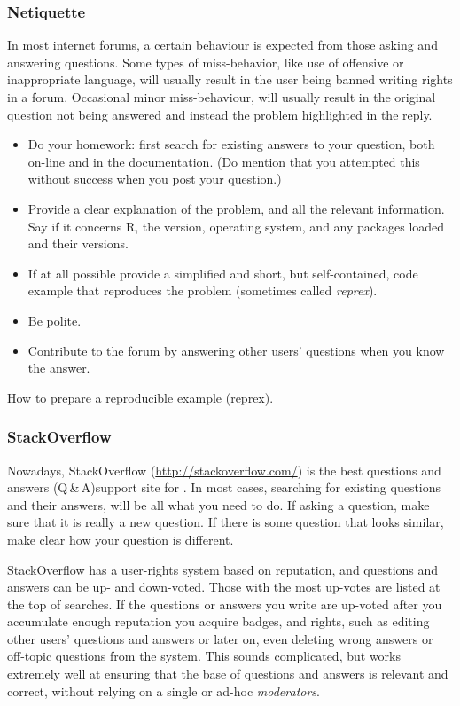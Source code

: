 \documentclass[krantz2,ChapterTOCs]{krantz}\usepackage{knitr}
\begin{document}
\subsubsection{Netiquette}
In most internet forums, a certain behaviour is expected from those asking and answering questions. Some types of miss-behavior, like use of offensive or inappropriate language, will usually result in the user being banned writing rights in a forum. Occasional minor miss-behaviour, will usually result in the original question not being answered and instead the problem highlighted in the reply.

\begin{itemize}
  \item Do your homework: first search for existing answers to your question, both on-line and in the documentation. (Do mention that you attempted this without success when you post your question.)
  \item Provide a clear explanation of the problem, and all the relevant information. Say if it concerns R, the version, operating system, and any packages loaded and their versions.
  \item If at all possible provide a simplified and short, but self-contained, code example that reproduces the problem (sometimes called \emph{reprex}).
  \item Be polite.
  \item Contribute to the forum by answering other users' questions when you know the answer.
\end{itemize}

\begin{explainbox}
 How to prepare a reproducible example (reprex).
\end{explainbox}

\subsubsection{StackOverflow}

Nowadays, StackOverflow (\url{http://stackoverflow.com/}) is the best questions and answers (Q\,\&\,A)support site for . In most cases, searching for existing questions and their answers, will be all what you need to do. If asking a question, make sure that it is really a new question. If there is some question that looks similar, make clear how your question is different.

StackOverflow has a user-rights system based on reputation, and questions and answers can be up- and down-voted. Those with the most up-votes are listed at the top of searches. If the questions or answers you write are up-voted after you accumulate enough reputation you acquire badges, and rights, such as editing other users' questions and answers or later on, even deleting wrong answers or off-topic questions from the system. This sounds complicated, but works extremely well at ensuring that the base of questions and answers is relevant and correct, without relying on a single or ad-hoc \emph{moderators}.
\end{document}
